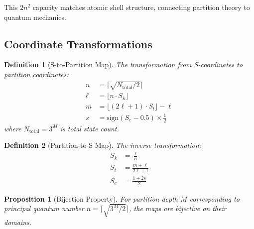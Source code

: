 \documentclass[twocolumn,10pt]{article}
\newtheorem{proposition}[theorem]{Proposition}
\newtheorem{definition}{Definition}
\begin{document}
This $2n^2$ capacity matches atomic shell structure, connecting partition theory to quantum mechanics.

\subsection{Coordinate Transformations}

\begin{definition}[S-to-Partition Map]
The transformation from S-coordinates to partition coordinates:
\begin{align}
n &= \lceil \sqrt{N_{\text{total}}/2} \rceil \\
\ell &= \lfloor n \cdot S_k \rfloor \\
m &= \lfloor (2\ell + 1) \cdot S_t \rfloor - \ell \\
s &= \text{sign}(S_e - 0.5) \times \frac{1}{2}
\end{align}
where $N_{\text{total}} = 3^M$ is total state count.
\end{definition}

\begin{definition}[Partition-to-S Map]
The inverse transformation:
\begin{align}
S_k &= \frac{\ell}{n} \\
S_t &= \frac{m + \ell}{2\ell + 1} \\
S_e &= \frac{1 + 2s}{2}
\end{align}
\end{definition}

\begin{proposition}[Bijection Property]
For partition depth $M$ corresponding to principal quantum number $n = \lceil\sqrt{3^M/2}\rceil$, the maps are bijective on their domains.
\end{proposition}
\end{document}
